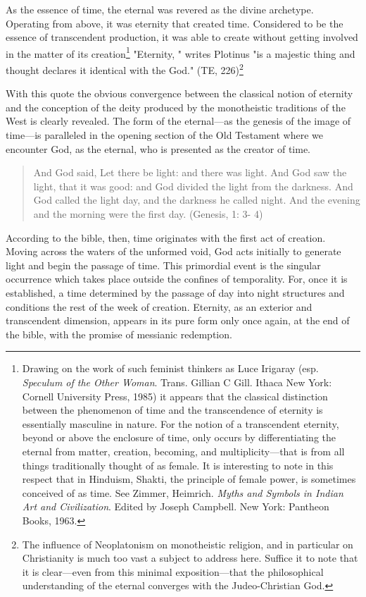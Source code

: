 As the essence of time, the eternal was revered as the divine
archetype. Operating from above, it was eternity that created time.
Considered to be the essence of transcendent production, it was able to
create without getting involved in the matter of its creation\footnote{Drawing on the work of such feminist thinkers as Luce Irigaray (esp. \textit{Speculum of the Other Woman}. Trans. Gillian C Gill. Ithaca New York: Cornell University Press, 1985) it appears that the classical distinction between the phenomenon of time and the transcendence of eternity is essentially masculine in nature. For the notion of a transcendent eternity, beyond or above the enclosure of time, only occurs by differentiating the eternal from matter, creation, becoming, and multiplicity---that is from all things traditionally thought of as female. It is interesting to note in this respect that in Hinduism, Shakti, the principle of female power, is sometimes conceived of as time. See Zimmer, Heimrich. \textit{Myths and Symbols in Indian Art and Civilization}. Edited by Joseph Campbell. New York: Pantheon Books, 1963.} "Eternity, " writes Plotinus "is a majestic thing and thought declares it identical with the God." (TE, 226)\footnote{The influence of Neoplatonism on monotheistic religion, and in particular on Christianity is much too vast a subject to address here. Suffice it to note that it is clear---even from this minimal exposition---that the philosophical understanding of the eternal converges with the Judeo-Christian God.}

With this quote the obvious convergence between the classical notion
of eternity and the conception of the deity produced by the monotheistic
traditions of the West is clearly revealed. The form of the eternal---as the
genesis of the image of time---is paralleled in the opening section of the Old Testament where we encounter God, as the eternal, who is presented as the creator of time. 

\begin{quote}
    And God said, Let there be light: and there was light. And God saw the light, that it was good: and God divided the light from the darkness. And God called the light day, and the darkness he called night. And the evening and the morning were the first day. (Genesis, 1: 3- 4) 
\end{quote}

According to the bible, then, time originates with the first act of creation. Moving across the waters of the unformed void, God acts initially to generate light and begin the passage of time. This primordial event is the singular occurrence which takes place outside the confines of temporality. For, once it is established, a time determined by the passage of day into night structures and conditions the rest of the week of creation. Eternity, as an exterior and transcendent dimension, appears in its pure form only once again, at the end of the bible, with the promise of messianic redemption.

